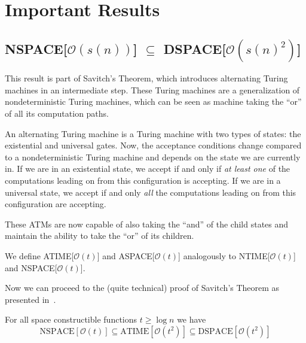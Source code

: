 \section{Important Results}\label{sec:important-results}

\subsection{NSPACE[$\mathcal{O}(s(n))$] $\subseteq$ DSPACE[$\mathcal{O}(s(n)^2)$]}\label{subsec:nspacesubsetdspacesquared}

This result is part of Savitch's Theorem, which introduces alternating Turing machines in an intermediate step.
These Turing machines are a generalization of nondeterministic Turing machines, which can be seen as machine taking the ``or'' of all its computation paths.

\begin{define}
    An alternating Turing machine is a Turing machine with two types of states: the existential and universal gates.
    Now, the acceptance conditions change compared to a nondeterministic Turing machine and depends on the state we are currently in.
    If we are in an existential state, we accept if and only if \emph{at least one} of the computations leading on from this configuration is accepting.
    If we are in a universal state, we accept if and only \emph{all} the computations leading on from this configuration are accepting.
\end{define}

These ATMs are now capable of also taking the ``and'' of the child states and maintain the ability to take the ``or'' of its children.

We define ATIME[$\mathcal{O}(t)$] and ASPACE[$\mathcal{O}(t)$] analogously to NTIME[$\mathcal{O}(t)$] and NSPACE[$\mathcal{O}(t)$].

Now we can proceed to the (quite technical) proof of Savitch's Theorem as presented in~\cite{descriptive-complexity}.

\begin{theorem}
    For all space constructible functions $t \geq \log n$ we have
    \[
        \text{NSPACE}[\mathcal{O}(t)] \subseteq \text{ATIME}[\mathcal{O}(t^2)] \subseteq \text{DSPACE}[\mathcal{O}(t^2)]
    \]
\end{theorem}

